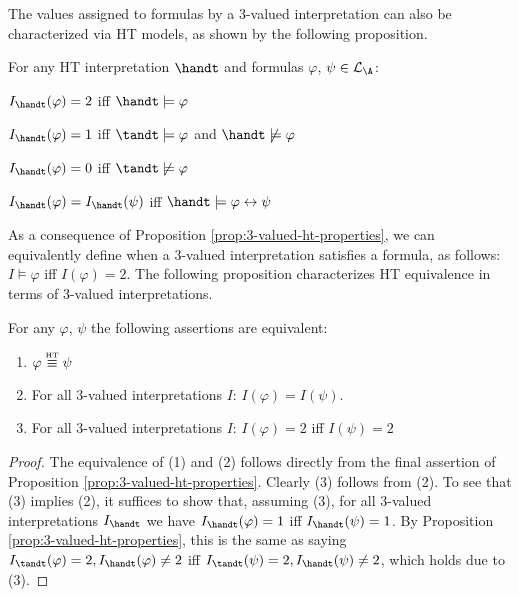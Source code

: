 The values assigned to formulas by a 3-valued interpretation can also
be characterized via HT models, as shown by the following proposition.

\begin{proposition}\label{prop:3-valued-ht-properties}
For any HT interpretation $\handt$ and formulas $\varphi$, $\psi \in \langa$:
\begin{description}
  \item $I_{\handt}(\varphi) = 2$ iff $\handt \models \varphi$ 
  \item $I_{\handt}(\varphi) = 1$ iff $\tandt \models \varphi$ and $\handt \not\models \varphi$
  \item $I_{\handt}(\varphi) = 0$ iff $\tandt \not\models \varphi$
  \item  $I_{\handt}(\varphi) = I_{\handt}(\psi)$ iff $\handt \models \varphi \leftrightarrow \psi$
\end{description}
\end{proposition}

As a consequence of Proposition \ref{prop:3-valued-ht-properties}, we can
equivalently define when a 3-valued interpretation satisfies a
formula, as follows: $I \models \varphi$ iff $I(\varphi)=2$. The
following proposition characterizes HT equivalence in terms of
3-valued interpretations.

\begin{proposition}
For any $\varphi$, $\psi$ the following assertions are equivalent:
  \begin{enumerate}[label={(\arabic*)}]
    \setlength\itemsep{0.15em}
    \item $\varphi \stackrel{\normalfont\mbox{\tiny HT}}{\equiv} \psi$
    \item For all 3-valued interpretations $I$: $I(\varphi) = I(\psi)$.
    \item For all 3-valued interpretations $I$: $I(\varphi) = 2$ iff $I(\psi) = 2$
  \end{enumerate}
\end{proposition}
\begin{proof}
  The equivalence of (1) and (2) follows directly from the final
  assertion of Proposition \ref{prop:3-valued-ht-properties}. Clearly
  (3) follows from (2). To see that (3) implies (2), it suffices to
  show that, assuming (3), for all 3-valued interpretations
  $I_{\handt}$ we have $I_{\handt}(\varphi) = 1$ iff
  $I_{\handt}(\psi) = 1$. By Proposition
  \ref{prop:3-valued-ht-properties}, this is the same as saying
  $I_{\tandt}(\varphi) = 2, I_{\handt}(\varphi) \neq 2$ iff
  $I_{\tandt}(\psi)=2, I_{\handt}(\psi) \neq 2$, which holds due to
  (3).
\end{proof}

